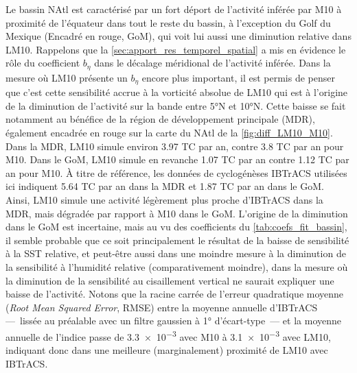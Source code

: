 \documentclass[../main.tex]{subfiles}
\begin{document}
Le bassin NAtl est caractérisé par un fort déport de l'activité inférée par M10 à proximité de l'équateur dans tout le reste du bassin, à l'exception du Golf du
Mexique (Encadré en rouge, GoM), qui voit lui aussi une diminution relative dans LM10. Rappelons que la \cref{sec:apport_res_temporel_spatial} a mis en évidence
le rôle du coefficient $b_\eta$ dans le décalage méridional de l'activité inférée. Dans la mesure où LM10 présente un $b_\eta$ encore plus important, il est
permis de penser que c'est cette sensibilité accrue à la vorticité absolue de LM10 qui est à l'origine de la diminution de l'activité sur la bande entre
\ang{5}N et \ang{10}N. Cette baisse se fait notamment au bénéfice de la région de développement principale (MDR), également encadrée en rouge sur la carte du
NAtl de la \cref{fig:diff_LM10_M10}. Dans la MDR, LM10 simule environ \num{3.97} TC par an, contre \num{3.8} TC par an pour M10. Dans le GoM, LM10 simule en
revanche \num{1.07} TC par an contre \num{1.12} TC par an pour M10. À titre de référence, les données de cyclogénèses IBTrACS utilisées ici indiquent \num{5.64}
TC par an dans la MDR et \num{1.87} TC par an dans le GoM. Ainsi, LM10 simule une activité légèrement plus proche d'IBTrACS dans la MDR, mais dégradée par
rapport à M10 dans le GoM. L'origine de la diminution dans le GoM est incertaine, mais au vu des coefficients du \cref{tab:coefs_fit_bassin}, il semble probable
que ce soit principalement le résultat de la baisse de sensibilité à la SST relative, et peut-être aussi dans une moindre mesure à la diminution de la
sensibilité à l'humidité relative (comparativement moindre), dans la mesure où la diminution de la sensibilité au cisaillement vertical ne saurait expliquer une
baisse de l'activité. Notons que la racine carrée de l'erreur quadratique moyenne (\textit{Root Mean Squared Error}, RMSE) entre la moyenne annuelle d'IBTrACS
---~lissée au préalable avec un filtre gaussien à \ang{1} d'écart-type~--- et la moyenne annuelle de l'indice passe de \num{3.3e-3} avec M10 à \num{3.1e-3} avec
LM10, indiquant donc dans une meilleure (marginalement) proximité de LM10 avec IBTrACS.
\end{document}
